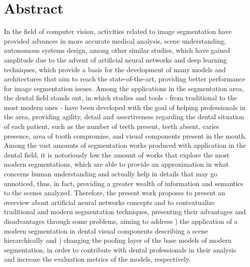 \section*{Abstract}
In the field of computer vision, activities related to image segmentation have provided advances in more accurate medical analysis, scene understanding, autonomous systems design, among other similar studies, which have gained amplitude due to the advent of artificial neural networks and deep learning techniques, which provide a basis for the development of many models and architectures that aim to reach the state-of-the-art, providing better performance for image segmentation issues.
Among the applications in the segmentation area, the dental field stands out, in which studies and tools - from traditional to the most modern ones - have been developed with the goal of helping professionals in the area, providing agility, detail and assertiveness regarding the dental situation of each patient, such as the number of teeth present, teeth absent, caries presence, area of tooth compromise, and visual components present in the mouth. 
Among the vast amounts of segmentation works produced with application in the dental field,  it is notoriously low the amount of works that explore the most modern segmentations, which are able to provide an approximation in what concerns human understanding and actually help in details that may go unnoticed, thus, in fact, providing a greater wealth of information and semantics to the scenes analyzed.
Therefore, the present work proposes to present an overview about artificial neural networks concepts and to contextualize traditional and modern segmentation techniques, presenting their advantages and disadvantages through some problems, aiming to address ) the application of a modern segmentation in dental visual components describing a scene hierarchically and ) changing the pooling layer of the base models of modern segmentation, in order to contribute with dental professionals in their analysis and increase the evaluation metrics of the models, respectively.
